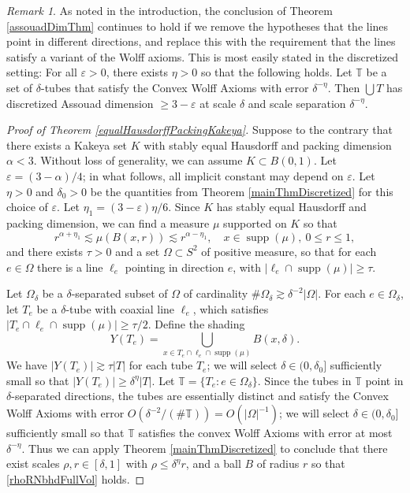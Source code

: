 \documentclass[letterpaper, reqno,11pt]{article}
\numberwithin{equation}{section}
\newcommand{\eps}{\varepsilon}
\newcommand{\tubes}{\mathbb{T}}
\newcommand{\supp}{\operatorname{supp}}
\numberwithin{thm}{section}
\theoremstyle{remark}
\newtheorem{rem}[thm]{Remark}
\begin{document}
\begin{rem}
As noted in the introduction, the conclusion of Theorem \ref{assouadDimThm} continues to hold if we remove the hypotheses that the lines point in different directions, and replace this with the requirement that the lines satisfy a variant of the Wolff axioms. This is most easily stated in the discretized setting: For all $\eps>0$, there exists $\eta>0$ so that the following holds. Let $\tubes$ be a set of $\delta$-tubes that satisfy the Convex Wolff Axioms with error $\delta^{-\eta}$. Then $\bigcup T$ has discretized Assouad dimension $\geq 3-\eps$ at scale $\delta$ and scale separation $\delta^{-\eta}$. 
\end{rem}


\begin{proof}[Proof of Theorem \ref{equalHausdorffPackingKakeya}]
Suppose to the contrary that there exists a Kakeya set $K$ with stably equal Hausdorff and packing dimension $\alpha < 3$. Without loss of generality, we can assume $K\subset B(0,1)$. Let $\eps = (3-\alpha)/4$; in what follows, all implicit constant may depend on $\eps$. Let $\eta>0$ and $\delta_0>0$ be the quantities from Theorem \ref{mainThmDiscretized} for this choice of $\eps$. Let $\eta_1=(3-\eps)\eta/6$. Since $K$ has stably equal Hausdorff and packing dimension, we can find a measure $\mu$ supported on $K$ so that
\begin{equation}\label{ballEstimateForMu}
	 r^{\alpha+\eta_1}\lesssim \mu(B(x,r))\lesssim r^{\alpha-\eta_1},\quad x\in\supp(\mu),\ 0\leq r\leq 1,
\end{equation} 
and there exists $\tau>0$ and a set $\Omega\subset S^2$ of positive measure, so that for each $e\in \Omega$ there is a line $\ell_e$ pointing in direction $e$, with  $|\ell_e\cap\supp(\mu)|\geq\tau$.

Let $\Omega_\delta$ be a $\delta$-separated subset of $\Omega$ of cardinality $\#\Omega_\delta\gtrsim \delta^{-2}|\Omega|$. For each $e\in\Omega_\delta$, let $T_e$ be a $\delta$-tube with coaxial line $\ell_e$, which satisfies $|T_e \cap \ell_e\cap\supp(\mu)|\geq\tau/2$. Define the shading
\[
Y(T_e) = \bigcup_{x\in T_e \cap \ell_e\cap\supp(\mu)}B(x,\delta).
\]
We have $|Y(T_e)|\gtrsim\tau|T|$ for each tube $T_e$; we will select $\delta\in(0,\delta_0]$ sufficiently small so that $|Y(T_e)|\geq\delta^{\eta}|T|$. Let $\tubes = \{T_e\colon e\in\Omega_\delta\}$. Since the tubes in $\tubes$ point in $\delta$-separated directions, the tubes are essentially distinct and satisfy the Convex Wolff Axioms with error $O(\delta^{-2}/(\#\tubes))=O(|\Omega|^{-1})$; we will select $\delta\in (0,\delta_0]$ sufficiently small so that $\tubes$ satisfies the convex Wolff Axioms with error at most $\delta^{-\eta}$. Thus we can apply Theorem \ref{mainThmDiscretized} to conclude that there exist scales $\rho,r \in[\delta,1]$ with $\rho\leq\delta^{\eta}r$, and a ball $B$ of radius $r$ so that \eqref{rhoRNbhdFullVol} holds.


\end{proof}
\end{document}
